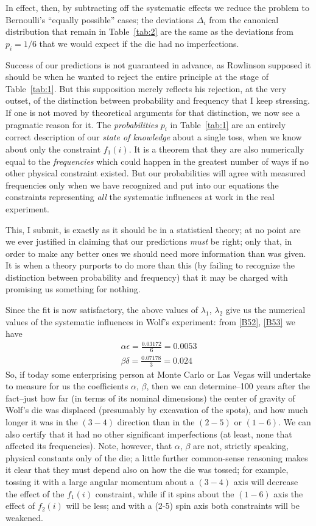 {In effect, then, by subtracting off the systematic effects we reduce the problem to Bernoulli's ``equally possible'' cases; the deviations $\Delta_i$ from the canonical distribution that remain in Table~\ref{tab:2} are the same as the deviations from $p_i = 1/6$ that we would expect if the die had no imperfections.

Success of our predictions is not guaranteed in advance, as Rowlinson supposed it should be when he wanted to reject the entire principle at the stage of Table~\ref{tab:1}.
But this supposition merely reflects his rejection, at the very outset, of the distinction between probability and frequency that I keep stressing.
If one is not moved by theoretical arguments for that distinction, we now see a pragmatic reason for it.
The \emph{probabilities} $p_i$ in Table~\ref{tab:1} are an entirely correct description of our \emph{state of knowledge} about a single toss, when we know about only the constraint $f_1(i)$.
It is a theorem that they are also numerically equal to the \emph{frequencies} which could happen in the greatest number of ways if no other physical constraint existed.
But our probabilities will agree with measured frequencies only when we have recognized and put into our equations the constraints representing \emph{all} the systematic influences at work in the real experiment.

This, I submit, is exactly as it should be in a statistical theory; at no point are we ever justified in claiming that our predictions \emph{must} be right; only that, in order to make any better ones we should need more information than was given.
It is when a theory purports to do more than this (by failing to recognize the distinction between probability and frequency) that it may be charged with promising us something for nothing.

Since the fit is now satisfactory, the above values of $\lambda_1$, $\lambda_2$ give us the numerical values of the systematic influences in Wolf's experiment: from \eqref{B52}, \eqref{B53} we have
\begin{align}
	\alpha\epsilon = \frac{0.03172}{6} = 0.0053\label{B68}\\
	\beta\delta = \frac{0.07178}{3} = 0.024\label{B69}
\end{align}
So, if today some enterprising person at Monte Carlo or Las Vegas will undertake to measure for us the coefficients $\alpha$, $\beta$, then we can determine--100 years after the fact--just how far (in terms of its nominal dimensions) the center of gravity of Wolf's die was displaced (presumably by excavation of the spots), and how much longer it was in the $(3{-}4)$ direction than in the $(2{-}5)$ or $(1{-}6)$.
We can also certify that it had no other significant imperfections (at least, none that affected its frequencies).
Note, however, that $\alpha$, $\beta$ are not, strictly speaking, physical constants only of the die; a little further common-sense reasoning makes it clear that they must depend also on how the die was tossed;
for example, tossing it with a large angular momentum about a $(3{-}4)$ axis will decrease the effect of the $f_1(i)$ constraint, while if it spins about the $(1{-}6)$ axis the effect of $f_2(i)$ will be less; and with a (2{-}5) spin axis both constraints will be weakened.

}
